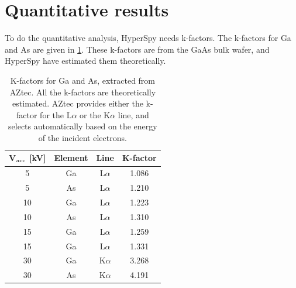 \section{Quantitative results}
\label{sec:results:quantification}





To do the quantitative analysis, HyperSpy needs k-factors.
The k-factors for Ga and As are given in \cref{tab:results:k-factors}.
These k-factors are from the GaAs bulk wafer, and HyperSpy have estimated them theoretically.

\begin{table}[h]
    \centering
    \caption{
        K-factors for Ga and As, extracted from AZtec.
        All the k-factors are theoretically estimated.
        AZtec provides either the k-factor for the L$\alpha$ or the K$\alpha$ line, and selects automatically based on the energy of the incident electrons.
    }
    \label{tab:results:k-factors}
    \begin{tabular}{cccc}
        V$_\textnormal{acc}$ [kV] & Element & Line      & K-factor \\
        \hline
        5                         & Ga      & L$\alpha$ & 1.086    \\
        5                         & As      & L$\alpha$ & 1.210    \\
        10                        & Ga      & L$\alpha$ & 1.223    \\
        10                        & As      & L$\alpha$ & 1.310    \\
        15                        & Ga      & L$\alpha$ & 1.259    \\
        15                        & Ga      & L$\alpha$ & 1.331    \\
        30                        & Ga      & K$\alpha$ & 3.268    \\
        30                        & As      & K$\alpha$ & 4.191
    \end{tabular}
\end{table}

